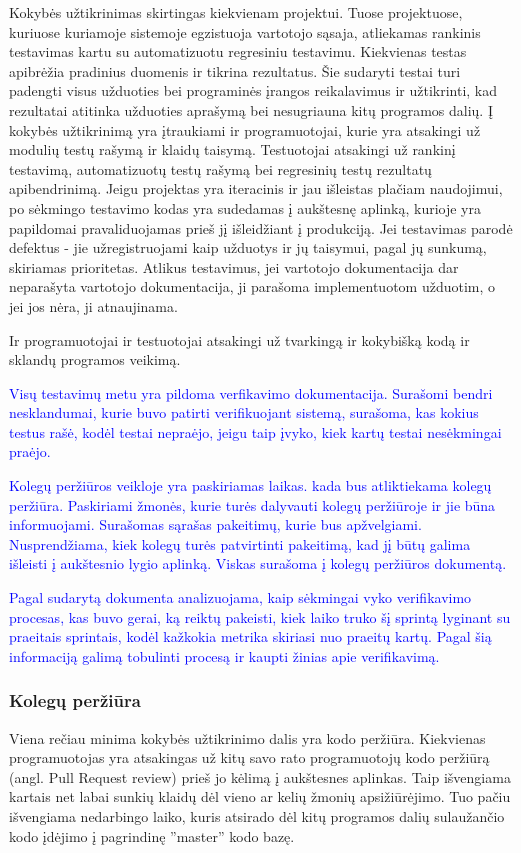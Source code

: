 \documentclass{VUMIFPSkursinis}
\begin{document}
	Kokybės užtikrinimas skirtingas kiekvienam projektui.
	Tuose projektuose, kuriuose kuriamoje sistemoje egzistuoja vartotojo sąsaja, atliekamas rankinis testavimas kartu su automatizuotu regresiniu testavimu. Kiekvienas testas apibrėžia pradinius duomenis ir tikrina rezultatus. Šie sudaryti testai turi padengti visus užduoties bei programinės įrangos reikalavimus ir užtikrinti, kad rezultatai atitinka užduoties aprašymą bei nesugriauna kitų programos dalių.
	Į kokybės užtikrinimą yra įtraukiami ir programuotojai, kurie yra atsakingi už modulių testų rašymą ir klaidų taisymą.
	Testuotojai atsakingi už rankinį testavimą, automatizuotų testų rašymą bei regresinių testų rezultatų apibendrinimą.
	Jeigu projektas yra iteracinis ir jau išleistas plačiam naudojimui, po sėkmingo testavimo kodas yra sudedamas į aukštesnę aplinką, kurioje yra papildomai pravaliduojamas prieš jį išleidžiant į produkciją.
	Jei testavimas parodė defektus - jie užregistruojami kaip užduotys ir jų taisymui, pagal jų sunkumą, skiriamas prioritetas. 
Atlikus testavimus, jei vartotojo dokumentacija dar neparašyta vartotojo dokumentacija, ji parašoma implementuotom užduotim, o jei jos nėra, ji atnaujinama.
	\par
	Ir programuotojai ir testuotojai atsakingi už tvarkingą ir kokybišką kodą ir sklandų programos veikimą.

	\textcolor{blue}{Visų testavimų metu yra pildoma verfikavimo dokumentacija. 
				Surašomi bendri nesklandumai, kurie buvo patirti verifikuojant sistemą, surašoma, kas kokius testus rašė, kodėl testai nepraėjo, jeigu taip įvyko, kiek kartų testai nesėkmingai praėjo.}
	
	\textcolor{blue}{Kolegų peržiūros veikloje yra paskiriamas laikas. kada bus atliktiekama kolegų peržiūra.
				Paskiriami žmonės, kurie turės dalyvauti kolegų peržiūroje ir jie būna informuojami.
				Surašomas sąrašas pakeitimų, kurie bus apžvelgiami.
				Nusprendžiama, kiek kolegų turės patvirtinti pakeitimą, kad jį būtų galima išleisti į aukštesnio lygio aplinką.
				Viskas surašoma į kolegų peržiūros dokumentą.}

	\textcolor{blue}{Pagal sudarytą dokumenta analizuojama, kaip sėkmingai vyko verifikavimo procesas, kas buvo gerai, ką reiktų pakeisti, kiek laiko truko šį sprintą lyginant su praeitais sprintais, kodėl kažkokia metrika skiriasi nuo praeitų kartų.
				Pagal šią informaciją galimą tobulinti procesą ir kaupti žinias apie verifikavimą.}
	
	\newpage
	\subsubsection{Kolegų peržiūra}
	Viena rečiau minima kokybės užtikrinimo dalis yra kodo peržiūra.
	Kiekvienas programuotojas yra atsakingas už kitų savo rato programuotojų kodo peržiūrą (angl. Pull Request review) prieš jo kėlimą į aukštesnes aplinkas.
	Taip išvengiama kartais net labai sunkių klaidų dėl vieno ar kelių žmonių apsižiūrėjimo.
	Tuo pačiu išvengiama nedarbingo laiko, kuris atsirado dėl kitų programos dalių sulaužančio kodo įdėjimo į pagrindinę ''master'' kodo bazę.
\end{document}
